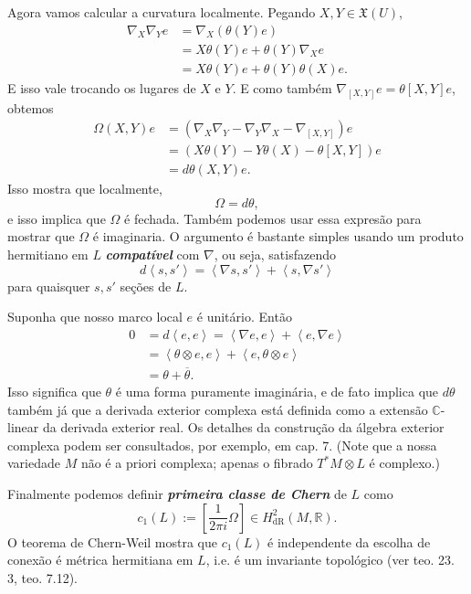 Agora vamos calcular a curvatura localmente. Pegando $X,Y \in \mathfrak{X}(U)$,
\begin{align*}
\nabla_X\nabla_Y e&=\nabla_X(\theta(Y) e)\\
&=X\theta(Y) e+\theta(Y)\nabla_Xe\\
&=X\theta(Y) e+\theta(Y)\theta(X)e.
\end{align*}
E isso vale trocando os lugares de $X$ e $Y$. E como também $\nabla_{[X,Y]}e=\theta[X,Y]e$, obtemos
\begin{align*}
\Omega(X,Y)e&=(\nabla_X\nabla_Y-\nabla_Y\nabla_X-\nabla_{[X,Y]})e\\
&=(X\theta(Y)-Y\theta(X)-\theta[X,Y])e\\
&=d\theta(X,Y)e.
\end{align*}
Isso mostra que localmente,
\[\Omega=d\theta,\]
e isso implica que $\Omega$ é fechada. Também podemos usar essa expresão para mostrar que $\Omega$ é imaginaria. O argumento é bastante simples usando um produto hermitiano em $L$ \textit{\textbf{compatível}} com $\nabla$, ou seja, satisfazendo
\[d\left<s,s'\right>=\left<\nabla s,s'\right>+\left<s,\nabla s'\right>\]
para quaisquer $s,s'$  seções de $L$.

 Suponha que nosso marco local $e$ é unitário. Então
\begin{align*}
0&=d\left<e,e\right>=\left<\nabla e,e\right>+\left<e,\nabla e\right>\\
&=\left<\theta \otimes e,e\right>+\left<e, \theta \otimes e\right>\\
&=\theta + \overline{\theta}.
\end{align*}
Isso significa que $\theta$ é uma forma puramente imaginária, e de fato implica que $d\theta$ também já que a derivada exterior complexa está definida como a extensão $\mathbb{C}$-linear da derivada exterior real. Os detalhes da construção da álgebra exterior complexa podem ser consultados, por exemplo, em \cite{leec} cap. 7. (Note que a nossa variedade $M$ não é a priori complexa; apenas o fibrado $T^*M \otimes L$ é complexo.)

Finalmente podemos definir \textit{\textbf{primeira classe de Chern}} de $L$ como
\[c_1(L):=\left[ \frac{1}{2\pi i}\Omega \right] \in H^{2}_{\operatorname{dR}}(M,\mathbb{R}).\]
O teorema de Chern-Weil mostra que $c_1(L)$ é independente da escolha de conexão é métrica hermitiana em $L$, i.e. é um invariante topológico (ver \cite{tu-diff} teo. 23. 3, \cite{leec} teo. 7.12).

